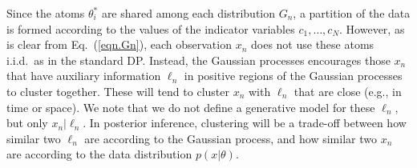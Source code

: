 \documentclass[runningheads,a4paper]{iscide}
\newcommand{\bs}[1]{\boldsymbol{#1}}
\begin{document}
Since the atoms $\theta_i^*$ are shared among each distribution $G_n$, a
partition of the data is formed according to the values of the indicator
variables $c_1,\dots,c_N$. However, as is clear from Eq.\ (\ref{eqn.Gn}), each observation $x_n$ does not use these atoms i.i.d.\ as in the standard DP. Instead, the Gaussian processes encourages those $x_n$ that have auxiliary information $\ell_n$ in positive regions of the Gaussian processes to cluster together. These will tend to cluster $x_n$ with $\ell_n$ that are close (e.g., in time or space). We note that we do not define a generative model for these $\ell_n$, but only $x_n | \ell_n$. In posterior inference, clustering will be a trade-off between how similar two $\ell_n$ are according to the Gaussian process, and how similar two $x_n$ are according to the data distribution $p(x|\theta)$.



%
%
\end{document}
